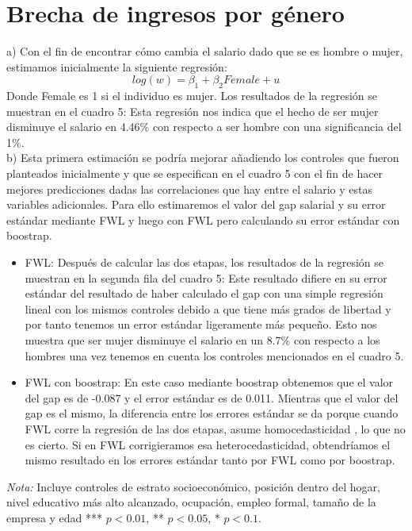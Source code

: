 \section{Brecha de ingresos por género} \label{Sec:brecha}
a) Con el fin de encontrar cómo cambia el salario dado que se es hombre o mujer, estimamos inicialmente la siguiente regresión:
\begin{equation}
    log(w) = \beta_1 + \beta_2 Female + u
\end{equation}
Donde Female es 1 si el individuo es mujer. Los resultados de la regresión se muestran en el cuadro 5:
Esta regresión nos indica que el hecho de ser mujer disminuye el salario en 4.46\% con respecto a ser hombre con una significancia del 1\%. \\
[1cm]
b) Esta primera estimación se podría mejorar añadiendo los controles que fueron planteados inicialmente y que se especifican en el cuadro 5 con el fin de hacer mejores predicciones dadas las correlaciones que hay entre el salario y estas variables adicionales. Para ello estimaremos el valor del gap salarial y su error estándar mediante FWL y luego con FWL pero calculando su error estándar con boostrap.
\begin{itemize}
    \item FWL: Después de calcular las dos etapas, los resultados de la regresión se muestran en la segunda fila del cuadro 5:    
    Este resultado difiere en su error estándar del resultado de haber calculado el gap con una simple regresión lineal con los mismos controles debido a que tiene más grados de libertad y por tanto tenemos un error estándar ligeramente más pequeño. Esto nos muestra que ser mujer disminuye el salario en un 8.7\% con respecto a los hombres una vez tenemos en cuenta los controles mencionados en el cuadro 5.
    \item FWL con boostrap: En este caso mediante boostrap obtenemos que el valor del gap es de -0.087 y el error estándar es de 0.011. Mientras que el valor del gap es el mismo, la diferencia entre los errores estándar se da porque cuando FWL corre la regresión de las dos etapas, asume homocedasticidad , lo que no es cierto. Si en FWL corrigieramos esa heterocedasticidad, obtendríamos el mismo resultado en los errores estándar tanto por FWL como por boostrap.
\end{itemize}

\begin{table}[H]
\centering

\scriptsize{\begin{flushleft}\textit{Nota:} Incluye controles de estrato socioeconómico, posición dentro del hogar, nivel educativo más alto alcanzado, ocupación, empleo formal, tamaño de la empresa y edad *** $p<0.01$, ** $p<0.05$, * $p<0.1$.  \end{flushleft}} 
\end{table}

